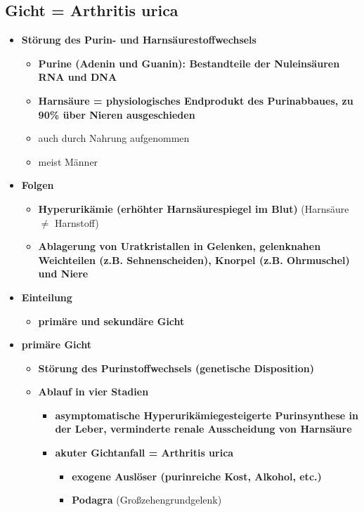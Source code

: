 \subsection{Gicht = Arthritis urica}
	\begin{itemize}
		\item \textbf{Störung des Purin- und Harnsäurestoffwechsels}
			\begin{itemize}
				\item \textbf{Purine (Adenin und Guanin): Bestandteile der Nuleinsäuren RNA und DNA}
				\item \textbf{Harnsäure = physiologisches Endprodukt des Purinabbaues, zu 90\% über Nieren ausgeschieden}
				\item auch durch Nahrung aufgenommen
				\item meist Männer
			\end{itemize}
		\item \textbf{Folgen}
			\begin{itemize}
				\item \textbf{Hyperurikämie (erhöhter Harnsäurespiegel im Blut)} (Harnsäure $\neq$ Harnstoff)
				\item \textbf{Ablagerung von Uratkristallen in Gelenken, gelenknahen Weichteilen (z.B. Sehnenscheiden), Knorpel (z.B. Ohrmuschel) und Niere}
			\end{itemize}
		\item \textbf{Einteilung}
			\begin{itemize}
				\item \textbf{primäre und sekundäre Gicht}
			\end{itemize}
		\item \textbf{primäre Gicht}
			\begin{itemize}
				\item \textbf{Störung des Purinstoffwechsels (genetische Disposition)}
				\item \textbf{Ablauf in vier Stadien}
					\begin{itemize}
						\item \textbf{asymptomatische Hyperurikämiegesteigerte Purinsynthese in der Leber, verminderte renale Ausscheidung von Harnsäure}
						\item \textbf{akuter Gichtanfall = Arthritis urica}
							\begin{itemize}
								\item \textbf{exogene Auslöser (purinreiche Kost, Alkohol, etc.)}
								\item \textbf{Podagra} (Großzehengrundgelenk)

\end{itemize}
\end{itemize}
\end{itemize}
\end{itemize}

